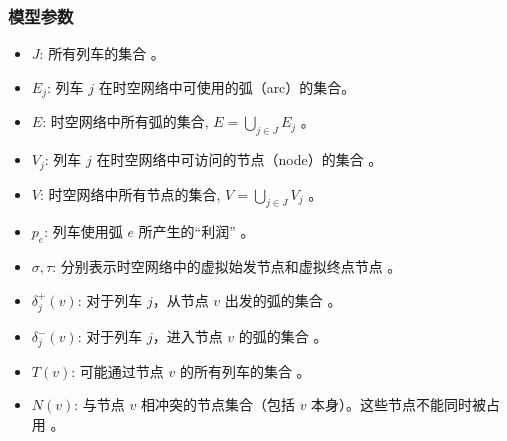 \documentclass{article}
\begin{document}
    \subsubsection{模型参数}
    \begin{itemize}
        \item $J$: 所有列车的集合 。
        \item $E_j$: 列车 $j$ 在时空网络中可使用的弧（arc）的集合。
        \item $E$: 时空网络中所有弧的集合, $E = \bigcup_{j \in J} E_j$ 。
        \item $V_j$: 列车 $j$ 在时空网络中可访问的节点（node）的集合 。
        \item $V$: 时空网络中所有节点的集合, $V = \bigcup_{j \in J} V_j$ 。
        \item $p_e$: 列车使用弧 $e$ 所产生的“利润” 。
        \item $\sigma, \tau$: 分别表示时空网络中的虚拟始发节点和虚拟终点节点 。
        \item $\delta_j^+(v)$: 对于列车 $j$，从节点 $v$ 出发的弧的集合 。
        \item $\delta_j^-(v)$: 对于列车 $j$，进入节点 $v$ 的弧的集合 。
        \item $T(v)$: 可能通过节点 $v$ 的所有列车的集合 。
        \item $N(v)$: 与节点 $v$ 相冲突的节点集合（包括 $v$ 本身）。这些节点不能同时被占用 。
    \end{itemize}
\end{document}
